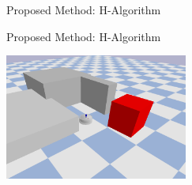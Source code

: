\begin{frame}[fragile]{Proposed Method: H-Algorithm}
  \begin{center}
\begin{figure}
  \centering
  \quad
\end{figure}
  \end{center}
\end{frame}

\begin{frame}[fragile]{Proposed Method: H-Algorithm}
  \begin{center}
  \includegraphics[width=0.45\textwidth]{figures/proposed_method/connecting_nodes/blocking_obj/robot_4}
  \end{center}
\end{frame}


